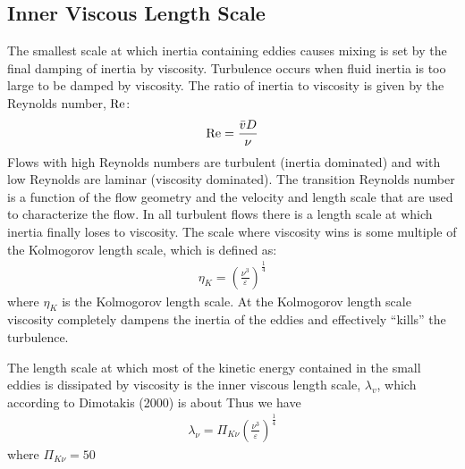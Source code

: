 \documentclass[letterpaper,10pt,english]{sphinxmanual}
\begin{document}
%
\begin{sphinxVerbatim}[commandchars=\\\{\}]
\end{sphinxVerbatim}


\subsection{Inner Viscous Length Scale}
\label{\detokenize{Rapid_Mix/RM_Derivations:inner-viscous-length-scale}}\label{\detokenize{Rapid_Mix/RM_Derivations:heading-inner-viscous-length-scale}}
The smallest scale at which inertia containing eddies causes mixing is set by the final damping of inertia by viscosity. Turbulence occurs when fluid inertia is too large to be damped by viscosity. The ratio of inertia to viscosity is given by the Reynolds number, \(\rm Re\):
\begin{equation}\label{equation:Rapid_Mix/RM_Derivations:Rapid_Mix/RM_Derivations:43}
\begin{split}{\rm{Re}} = \frac{\bar vD}{\nu}\end{split}
\end{equation}
Flows with high Reynolds numbers are turbulent (inertia dominated) and with low Reynolds are laminar (viscosity dominated). The transition Reynolds number is a function of the flow geometry and the velocity and length scale that are used to characterize the flow. In all turbulent flows there is a length scale at which inertia finally loses to viscosity. The scale where viscosity wins is some multiple of the Kolmogorov length scale, which is defined as:
\begin{equation}\label{equation:Rapid_Mix/RM_Derivations:Rapid_Mix/RM_Derivations:44}
\begin{split}\eta_K = \left( \frac{\nu^3}{\varepsilon} \right)^{\frac{1}{4}}\end{split}
\end{equation}
where \(\eta_K\) is the Kolmogorov length scale. At the Kolmogorov length scale viscosity completely dampens the inertia of the eddies and effectively “kills” the turbulence.

The length scale at which most of the kinetic energy contained in the small eddies is dissipated by viscosity is the inner viscous length scale, \(\lambda_v\), which according to Dimotakis (2000) is about 
Thus we have
\begin{equation}\label{equation:Rapid_Mix/RM_Derivations:eq_inner_viscous_length}
\begin{split}\lambda_\nu = \Pi_{K\nu}\left( \frac{\nu^3}{\varepsilon} \right)^{\frac{1}{4}}\end{split}
\end{equation}
where \(\Pi_{K\nu} = 50\)
\end{document}
